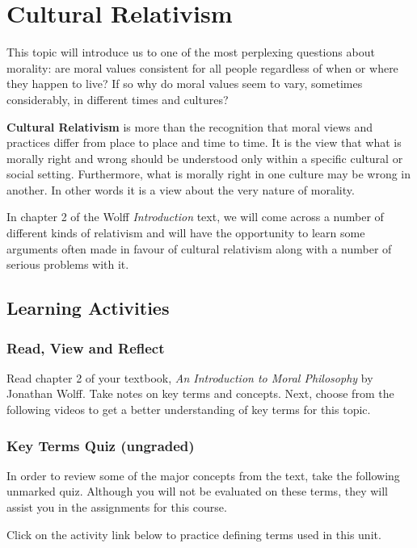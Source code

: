 \documentclass[
]{book}
\begin{document}
\hypertarget{cultural-relativism}{%
\section*{Cultural Relativism}\label{cultural-relativism}}

This topic will introduce us to one of the most perplexing questions about
morality: are moral values consistent for all people regardless of when or where
they happen to live? If so why do moral values seem to vary, sometimes
considerably, in different times and cultures?

\textbf{Cultural Relativism} is more than the recognition that moral views and
practices differ from place to place and time to time. It is the view that what
is morally right and wrong should be understood only within a specific cultural
or social setting. Furthermore, what is morally right in one culture may be
wrong in another. In other words it is a view about the very nature of morality.

In chapter 2 of the Wolff \emph{Introduction} text, we will come across a number of
different kinds of relativism and will have the opportunity to learn some
arguments often made in favour of cultural relativism along with a number of
serious problems with it.

\hypertarget{learning-activities-2}{%
\subsection*{Learning Activities}\label{learning-activities-2}}

\begin{reflect}
\hypertarget{read-view-and-reflect-1}{%
\subsubsection*{Read, View and Reflect}\label{read-view-and-reflect-1}}

Read chapter 2 of your textbook, \emph{An Introduction to Moral Philosophy} by
Jonathan Wolff. Take notes on key terms and concepts.
Next, choose from the following videos to get a better understanding of key
terms for this topic.

\hypertarget{key-terms-quiz-ungraded}{%
\subsubsection*{Key Terms Quiz (ungraded)}\label{key-terms-quiz-ungraded}}

In order to review some of the major concepts from the text, take the following unmarked quiz. Although you will not be evaluated on these terms, they will assist you in the assignments for this course.

Click on the activity link below to practice defining terms used in this unit.
\end{reflect}
\end{document}
